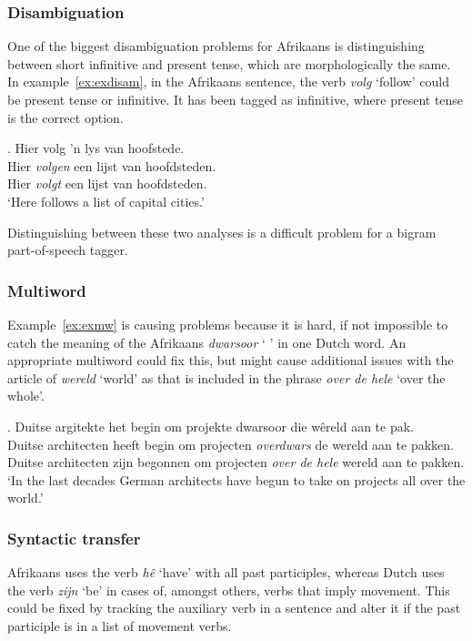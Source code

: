 \documentclass[11pt]{article}
\begin{document}
\subsubsection{Disambiguation}

One of the biggest disambiguation problems for Afrikaans is distinguishing between short infinitive and present 
tense, which are morphologically the same. In example~\ref{ex:exdisam}, in the Afrikaans sentence, the verb 
{\em volg} `follow' could be present tense or infinitive. It has been tagged as infinitive, where present tense 
is the correct option.

\ex. \label{ex:exdisam} 
    Hier volg 'n lys van hoofstede. \\
    Hier {\em volgen} een lijst van hoofdsteden. \\
    Hier {\em volgt} een lijst van hoofdsteden.  \\
   `Here follows a list of capital cities.'

Distinguishing between these two analyses is a difficult problem for a bigram part-of-speech tagger.

\subsubsection{Multiword}

Example~\ref{ex:exmw} is causing problems because it is hard, if not impossible to catch the meaning of the 
Afrikaans {\em dwarsoor} ` ' in one Dutch word. An appropriate multiword could fix this, but might 
cause additional issues with the article of {\em wereld} `world' as that is included in the 
phrase {\em over de hele} `over the whole'.

\ex. \label{ex:exmw} 
    Duitse argitekte het begin om projekte dwarsoor die wêreld aan te pak. \\
    Duitse architecten heeft begin om projecten {\em overdwars} de wereld aan te pakken. \\
    Duitse architecten zijn begonnen om projecten {\em over de hele} wereld aan te pakken. \\
   `In the last decades German architects have begun to take on projects all over the world.'

\subsubsection{Syntactic transfer}

Afrikaans uses the verb {\em hê} `have' with all past participles, whereas Dutch uses the 
verb {\em zijn} `be' in cases of, amongst others, verbs that imply movement. This could be fixed 
by tracking the auxiliary verb in a sentence and alter it if the past participle is in a list
of movement verbs.
\end{document}
